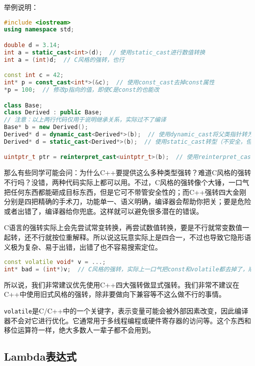 \documentclass[../main.tex]{subfiles}
\begin{document}
举例说明：
\begin{lstlisting}[language=C++]
#include <iostream>
using namespace std;

double d = 3.14;
int a = static_cast<int>(d);  // 使用static_cast进行数值转换
int a = (int)d;  // C风格的强转，也行

const int c = 42;
int* p = const_cast<int*>(&c);  // 使用const_cast去掉const属性
*p = 100;  // 修改p指向的值，即使C是const的也能改

class Base;
class Derived : public Base;
// 注意：以上两行代码仅用于说明继承关系，实际过不了编译
Base* b = new Derived();
Derived* d = dynamic_cast<Derived*>(b);  // 使用dynamic_cast将父类指针转为子类
Derived* d = static_cast<Derived*>(b);  // 使用static_cast转型（不安全，但是能过编译）

uintptr_t ptr = reinterpret_cast<uintptr_t>(b);  // 使用reinterpret_cast将指针转换为整数
\end{lstlisting}

那么有些同学可能会问：为什么C++要提供这么多种类型强转？难道C风格的强转不行吗？没错，两种代码实际上都可以用。不过，C风格的强转像个大锤，一口气把任何东西都能砸成目标东西，但是它可不带管安全性的；而C++强转四大金刚分别是四把精确的手术刀，功能单一、语义明确，编译器会帮助你把关；要是危险或者出错了，编译器给你兜底。这样就可以避免很多潜在的错误。

C语言的强转实际上会先尝试常变转换，再尝试数值转换，要是不行就常变数值一起转，还不行就按位重解释。所以说这玩意实际上是四合一，不过也导致它隐形语义极为复杂、易于出错，出错了也不容易搜索定位。

\begin{lstlisting}[language=C++]
const volatile void* v = ...;
int* bad = (int*)v;  // C风格的强转，实际上一口气把const和volatile都去掉了，顺便做了个按位重解释
\end{lstlisting}

所以说，我们非常建议优先使用C++四大强转做显式强转。我们非常不建议在C++中使用旧式风格的强转，除非要做向下兼容等不这么做不行的事情。

\begin{note}
  \texttt{volatile}是C/C++中的一个关键字，表示变量可能会被外部因素改变，因此编译器不会对它进行优化。它通常用于多线程编程或硬件寄存器的访问等。这个东西和移位运算符一样，绝大多数人一辈子都不会用到。
\end{note}

\subsection{Lambda表达式}
\end{document}
